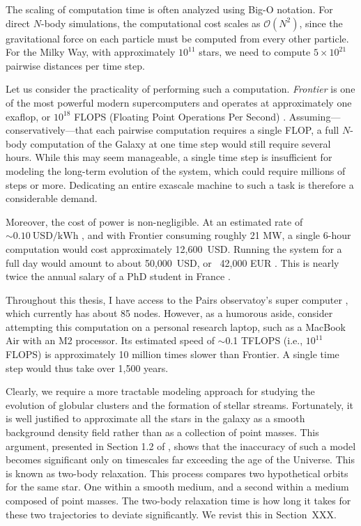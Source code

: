     The scaling of computation time is often analyzed using Big-O notation. For direct $N$-body simulations, the computational cost scales as $\mathcal{O}(N^2)$, since the gravitational force on each particle must be computed from every other particle. For the Milky Way, with approximately $10^{11}$ stars, we need to compute $5 \times 10^{21}$ pairwise distances per time step.

    Let us consider the practicality of performing such a computation. \textit{Frontier} is one of the most powerful modern supercomputers and operates at approximately one exaflop, or $10^{18}$ FLOPS (Floating Point Operations Per Second) \citep{atchley2023frontier}. Assuming—conservatively—that each pairwise computation requires a single FLOP, a full $N$-body computation of the Galaxy at one time step would still require several hours. While this may seem manageable, a single time step is insufficient for modeling the long-term evolution of the system, which could require millions of steps or more. Dedicating an entire exascale machine to such a task is therefore a considerable demand.

    Moreover, the cost of power is non-negligible. At an estimated rate of $\sim 0.10~\mathrm{USD}/\mathrm{kWh}$ \citep{table20245}, and with Frontier consuming roughly 21 MW, a single 6-hour computation would cost approximately 12,600~USD. Running the system for a full day would amount to about 50,000~USD, or ~42,000 EUR \citep{ECB_USD_EUR_2025}. This is nearly twice the annual salary of a PhD student in France \citep{MESR_financement_doctoral}.

    Throughout this thesis, I have access to the Pairs observatoy's super computer \citep{DIO_OBSPM}, which currently has about 85 nodes. However, as a humorous aside, consider attempting this computation on a personal research laptop, such as a MacBook Air with an M2 processor. Its estimated speed of $\sim$0.1 TFLOPS (i.e., $10^{11}$ FLOPS) \citep{hubner2025apple} is approximately 10 million times slower than Frontier. A single time step would thus take over 1,500 years.

    Clearly, we require a more tractable modeling approach for studying the evolution of globular clusters and the formation of stellar streams. Fortunately, it is well justified to approximate all the stars in the galaxy as a smooth background density field rather than as a collection of point masses. This argument, presented in Section 1.2 of \citet{2008gady.book.....B}, shows that the inaccuracy of such a model becomes significant only on timescales far exceeding the age of the Universe. This is known as two-body relaxation. This process compares two hypothetical orbits for the same star. One within a smooth medium, and a second within a medium composed of point masses. The two-body relaxation time is how long it takes for these two trajectories to deviate significantly. We revist this in Section~XXX.
        

